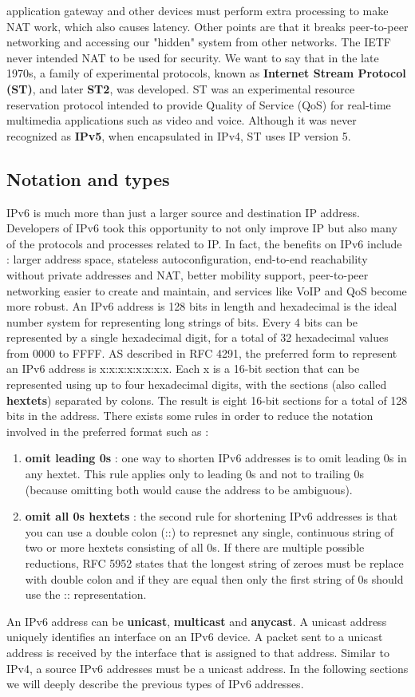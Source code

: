 \documentclass[11pt]{article}
\begin{document}
application gateway and other devices must perform extra processing to make NAT work, which also causes latency. Other points are that it breaks peer-to-peer networking and accessing our "hidden" system from other networks. The IETF never intended NAT to be used for security. We want to say that in the late 1970s, a family of experimental protocols, known as \textbf{Internet Stream Protocol (ST)}, and later \textbf{ST2}, was developed. ST was an experimental resource reservation protocol intended to provide Quality of Service (QoS) for real-time multimedia applications such as video and voice. Although it was never recognized as \textbf{IPv5}, when encapsulated in IPv4, ST uses IP version 5. 
\subsection{Notation and types}
IPv6 is much more than just a larger source and destination IP address. Developers of IPv6 took this opportunity to not only improve IP but also many of the protocols and processes related to IP. In fact, the benefits on IPv6 include : larger address space, stateless autoconfiguration, end-to-end reachability without private addresses and NAT, better mobility support, peer-to-peer networking easier to create and maintain, and services like VoIP and QoS become more robust. An IPv6 address is 128 bits in length and hexadecimal is the ideal number system for representing long strings of bits. Every 4 bits can be represented by a single hexadecimal  digit, for a total of 32 hexadecimal values from 0000 to FFFF. AS described in RFC 4291, the preferred form to represent an IPv6 address is x:x:x:x:x:x:x:x. Each x is a 16-bit section that can be represented using up to four hexadecimal digits, with the sections (also called \textbf{hextets}) separated by colons. The result is eight 16-bit sections for a total of 128 bits in the address. There exists some rules in order to reduce the notation involved in the preferred format such as :
\begin{enumerate}
\item \textbf{omit leading 0s} : one way to shorten IPv6 addresses is to omit leading 0s in any hextet. This rule applies only to leading 0s and not to trailing 0s (because omitting both would cause the address to be ambiguous).
\item \textbf{omit all 0s hextets} : the second rule for shortening IPv6 addresses is that you can use a double  colon (::) to represnet any single, continuous string of two or more hextets consisting of all 0s. If there are multiple possible reductions, RFC 5952 states that the longest string of zeroes must be replace with double colon and if they are equal then only the first string of 0s should use the :: representation.
\end{enumerate}
An IPv6 address can be \textbf{unicast}, \textbf{multicast} and \textbf{anycast}. A unicast address uniquely identifies an interface on an IPv6 device. A packet sent to a unicast address is received by the interface that is assigned to that address. Similar to IPv4, a source IPv6 addresses must be a unicast address. In the following sections we will deeply describe the previous types of IPv6 addresses.
\end{document}
